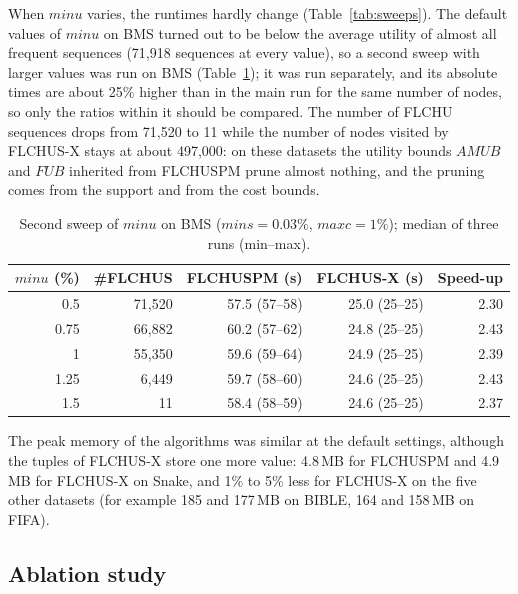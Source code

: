 \documentclass[pdflatex,sn-mathphys,Numbered]{sn-jnl}
\theoremstyle{thmstyleone}
\theoremstyle{thmstyletwo}
\theoremstyle{thmstylethree}
\newcommand{\FL}{\textsc{FLCHUSPM}}
\newcommand{\FX}{\textsc{FLCHUS-X}}
\newcommand{\amub}{\ensuremath{\mathit{AMUB}}}
\newcommand{\fub}{\ensuremath{\mathit{FUB}}}
\newcommand{\minu}{\ensuremath{\mathit{minu}}}
\newcommand{\maxc}{\ensuremath{\mathit{maxc}}}
\newcommand{\mins}{\ensuremath{\mathit{mins}}}
\begin{document}
When \minu{} varies, the runtimes hardly change (Table~\ref{tab:sweeps}). The default values of
\minu{} on BMS turned out to be below the average utility of almost all frequent sequences
(71{,}918 sequences at every value), so a second sweep with larger values was run on BMS
(Table~\ref{tab:bmsmu}); it was run separately, and its absolute times are about 25\% higher
than in the main run for the same number of nodes, so only the ratios within it should be
compared. The number of FLCHU sequences drops from 71{,}520 to 11 while the number of nodes
visited by \FX{} stays at about 497{,}000: on these datasets the utility bounds \amub{} and
\fub{} inherited from \FL{} prune almost nothing, and the pruning comes from the support and from
the cost bounds.

\begin{table}[t]
\centering
\caption{Second sweep of \minu{} on BMS ($\mins = 0.03\%$, $\maxc = 1\%$); median of three runs
(min--max).}
\label{tab:bmsmu}
\begin{tabular}{@{}rrrrr@{}}
\toprule
\minu{} (\%) & \#FLCHUS & \FL{} (s) & \FX{} (s) & Speed-up \\
\midrule
0.5 & 71{,}520 & 57.5 (57--58) & 25.0 (25--25) & 2.30 \\
0.75 & 66{,}882 & 60.2 (57--62) & 24.8 (25--25) & 2.43 \\
1 & 55{,}350 & 59.6 (59--64) & 24.9 (25--25) & 2.39 \\
1.25 & 6{,}449 & 59.7 (58--60) & 24.6 (25--25) & 2.43 \\
1.5 & 11 & 58.4 (58--59) & 24.6 (25--25) & 2.37 \\
\bottomrule
\end{tabular}
\end{table}

The peak memory of the algorithms was similar at the default settings, although the tuples of
\FX{} store one more value: 4.8\,MB for \FL{} and 4.9\,MB for \FX{} on Snake, and 1\% to 5\% less
for \FX{} on the five other datasets (for example 185 and 177\,MB on BIBLE, 164 and 158\,MB on
FIFA).

\subsection{Ablation study}
\end{document}
